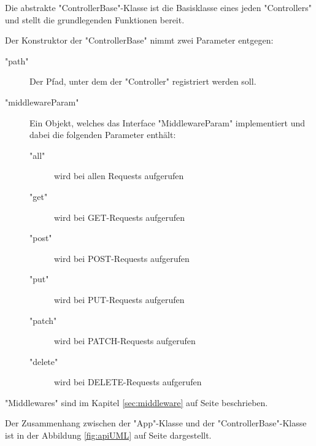 
Die abstrakte "ControllerBase"-Klasse ist die Basisklasse eines jeden "Controllers" und stellt die grundlegenden Funktionen bereit. 

Der Konstruktor der "ControllerBase" nimmt zwei Parameter entgegen:

\begin{description}
    \item["path"] Der Pfad, unter dem der "Controller" registriert werden soll.
    \item["middlewareParam"] Ein Objekt, welches das Interface "MiddlewareParam" implementiert und dabei die folgenden Parameter enthält:
    \begin{description}
        \item["all"] wird bei allen Requests aufgerufen
        \item["get"] wird bei GET-Requests aufgerufen
        \item["post"] wird bei POST-Requests aufgerufen
        \item["put"] wird bei PUT-Requests aufgerufen
        \item["patch"] wird bei PATCH-Requests aufgerufen
        \item["delete"] wird bei DELETE-Requests aufgerufen
    \end{description}
\end{description}


"Middlewares" sind im Kapitel \ref{sec:middleware} auf Seite \pageref{sec:middleware} beschrieben.

Der Zusammenhang zwischen der "App"-Klasse und der "ControllerBase"-Klasse ist in der Abbildung \ref{fig:apiUML} auf Seite \pageref{fig:apiUML} dargestellt.

